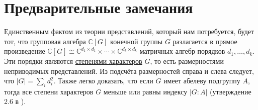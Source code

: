 \section{Предварительные замечания}

Единственным фактом из теории представлений, который нам потребуется, будет тот, что групповая алгебра $\mathbb{C}[G]$ конечной группы $G$ разлагается в прямое произведение $\mathbb{C}[G] \cong \mathbb{C}^{d_1 \times d_1} \times \dotsm \times \mathbb{C}^{d_k \times d_k}$ матричных алгебр порядков $d_1, \dotsc , d_k$. Эти порядки являются \hyperref[def:characters_degree]{степенями характеров} $G$, то есть размерностями неприводимых представлений. Из подсчёта размерностей справа и слева следует, что $|G| = \sum_id_i^2$. Также легко доказать, что если $G$ имеет абелеву подгруппу $A$, тогда все степени характеров $G$ меньше или равны индексу $|G:A|$ (утверждение 2.6 в \cite{huppert1998}).

